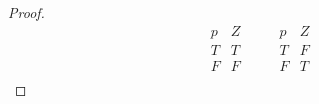 \documentclass[12pt]{article}
\begin{document}
\begin{proof}
\begin{displaymath}
\begin{array}{|c|c|}
            p & Z \\ %
            \hline %
            T & T \\
            F & F \\
        \end{array}
        \qquad
        \begin{array}{|c|c|}  %
            p & Z \\ %
            \hline %
            T & F \\
            F & T \\
        \end{array}
    \end{displaymath}
    

\end{proof}
\end{document}
